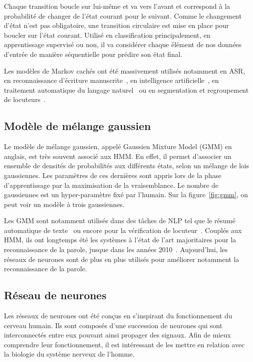 

Chaque transition boucle sur lui-même et va vers l'avant et correspond à la probabilité de changer de l'état courant pour le suivant. Comme le changement d'état n'est pas obligatoire, une transition circulaire est mise en place pour boucler sur l'état courant.
Utilisé en classification principalement, en apprentissage supervisé ou non, il va considérer chaque élément de nos données d'entrée de manière séquentielle pour prédire son état final.

Les modèles de Markov cachés ont été massivement utilisés notamment en ASR, en reconnaissance d'écriture manuscrite~\cite{Hu1996}, en intelligence artificielle~\cite{Gales2008}, en traitement automatique du langage naturel~\cite{Campbell2006} ou en segmentation et regroupement de locuteurs~\cite{Ajmera2002}.

\subsection{Modèle de mélange gaussien}
Le modèle de mélange gaussien, appelé Gaussien Mixture Model (GMM) en anglais, est très souvent associé aux HMM. En effet, il permet d'associer un ensemble de densités de probabilités aux différents états, selon un mélange de lois gaussiennes. Les paramètres de ces dernières sont appris lors de la phase d'apprentissage par la maximisation de la vraisemblance. Le nombre de gaussiennes est un hyper-paramètre fixé par l'humain. Sur la figure~\ref{fig:gmm}, on peut voir un modèle à trois gaussiennes.



Les GMM sont notamment utilisés dans des tâches de NLP tel que le résumé automatique de texte~\cite{Fattah2009} ou encore pour la vérification de locuteur~\cite{Baker2005}. Couplés aux HMM, ils ont longtemps été les systèmes à l'état de l'art majoritaires pour la reconnaissance de la parole, jusque dans les années 2010~\cite{Hinton2012}. Aujourd'hui, les réseaux de neurones sont de plus en plus utilisés pour améliorer notamment la reconnaissance de la parole.

\subsection{Réseau de neurones}
Les réseaux de neurones ont été conçus en s'inspirant du fonctionnement du cerveau humain. Ils sont composés d'une succession de neurones qui sont interconnectés entre eux pouvant ainsi propager des signaux.
Afin de mieux comprendre leur fonctionnement, il est intéressant de les mettre en relation avec la biologie du système nerveux de l'homme.

